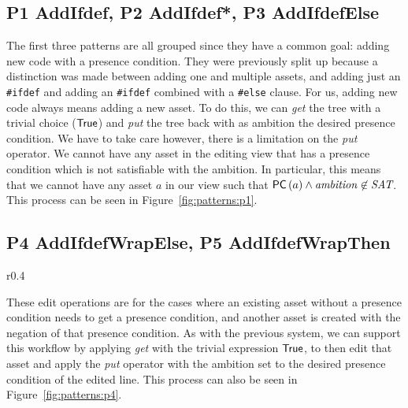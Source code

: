 \subsection*{P1 AddIfdef, P2 AddIfdef*, P3 AddIfdefElse}
The first three patterns are all grouped since they have a common goal:
adding new code with a presence condition. They were previously split up because
a distinction was made between adding one and multiple assets, and adding just an
\texttt{\#ifdef} and adding an \texttt{\#ifdef} combined with a \texttt{\#else} clause.
For us, adding new code always means adding a new asset. To do this, we can \emph{get}
the tree with a trivial choice (\({\sf True}\)) and \emph{put} the tree back with as
ambition the desired presence condition. We have to take care however, there is a limitation
on the \emph{put} operator. We cannot have any asset in the editing view that
has a presence condition which is not satisfiable with the ambition. In
particular, this means that we cannot have any asset $a$ in our view such that
\({\sf PC}\left(a\right) \land \mathit{ambition} \not\in \textit{SAT}\).
This process can be seen in Figure~\ref{fig:patterns:p1}.

\subsection*{P4 AddIfdefWrapElse, P5 AddIfdefWrapThen}
\begin{wrapfigure}{r}{0.4\textwidth}
  \centering
  \caption{Workflow for wrapping assets with presence conditions, relevant for patterns \emph{P4} and \emph{P5}.}
  \label{fig:patterns:p4}
\end{wrapfigure}
These edit operations are for the cases where an existing asset without a
presence condition needs to get a presence condition, and another asset is
created with the negation of that presence condition. As with the previous
system, we can support this workflow by applying \emph{get} with the trivial
expression \({\sf True}\), to then edit that asset and apply the \emph{put}
operator with the ambition set to the desired presence condition of the
edited line. This process can also be seen in Figure~\ref{fig:patterns:p4}.

